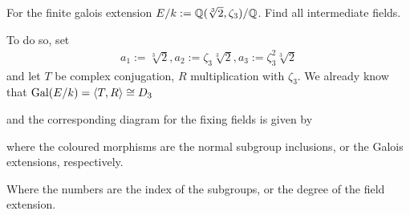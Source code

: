\begin{ex}[]
  For the finite galois extension $E/k :=\mathbb{Q}(\sqrt[3]{2},\zeta_3)/\mathbb{Q}$. Find all intermediate fields.

  To do so, set
  \begin{align*}
    a_1 := \sqrt[3]{2}, a_2 := \zeta_3 \sqrt[3]{2}, a_3 := \zeta_3^{2} \sqrt[3]{2}
  \end{align*}
  and let $T$ be complex conjugation, $R$ multiplication with $\zeta_3$.
  We already know that
  $\operatorname{Gal}(E/k) = \langle T,R\rangle \cong D_3$

  \begin{center}
  \end{center}
  and the corresponding diagram for the fixing fields is given by
  \begin{center}
  \end{center}
  where the coloured morphisms are the normal subgroup inclusions, or the Galois extensions, respectively.

  Where the numbers are the index of the subgroups, or the degree of the field extension.
\end{ex}



